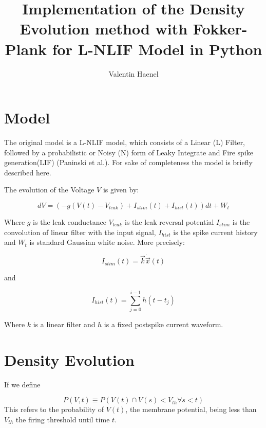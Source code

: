 \documentclass[10pt]{article}
\title{Implementation of the Density Evolution method with
Fokker-Plank for L-NLIF Model in Python}
\author{Valentin Haenel}
\begin{document}
 

\maketitle

\section{Model}
The original model is a L-NLIF model, which consists of a Linear
(L) Filter, followed by a probabilistic or Noisy (N) form of Leaky
Integrate and Fire spike generation(LIF) (Paninski et
al.\cite{PaninskiPillowSimoncelli}). For sake of completeness the
model is briefly described here.

The evolution of the Voltage $V$ is given by:

\begin{equation}
    dV = (-g(V(t) -V_{leak}) +I_{stim}(t) + I_{hist}(t)) dt + W_{t}
\end{equation}

Where $g$ is the leak conductance $V_{leak}$ is the leak reversal
potential $I_{stim}$ is the convolution of linear filter with the
input signal, $I_{hist}$ is the spike current history and $W_t$ is
standard Gaussian white noise. More precisely:

\begin{equation}
    I_{stim}(t) = \vec{k} \dot \vec{x}(t)
\end{equation}

and

\begin{equation}
    I_{hist}(t) = \sum_{j=0}^{i-1}h(t-t_j)
\end{equation}

Where $k$ is a linear filter and $h$ is a fixed postspike current waveform. 



\section{Density Evolution}


If we define 

\begin{equation}
    P(V,t) \equiv P(V(t) \cap  V(s) < V_{th} \forall s < t)
\end{equation}
This refers to the probability of $V(t)$, the membrane potential,
being less than $V_{th}$ the firing threshold until time $t$.  
\end{document}
